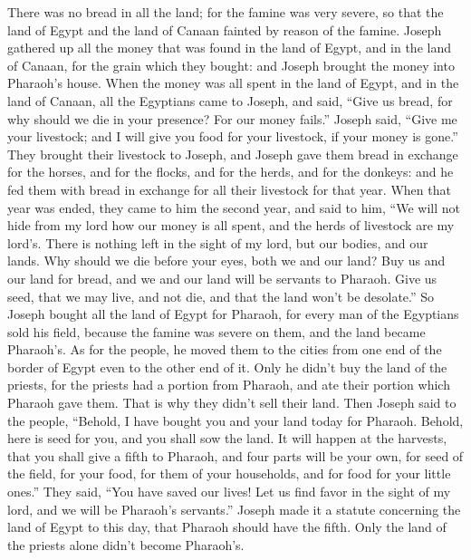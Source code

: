 \begin{paracol}{2}
\begin{otherlanguage}{english}
 There was no bread in all the land; for the famine was
very severe, so that the land of Egypt and the land of Canaan fainted by
reason of the famine.  Joseph gathered up all the money
that was found in the land of Egypt, and in the land of Canaan, for the
grain which they bought: and Joseph brought the money into Pharaoh's
house.  When the money was all spent in the land of
Egypt, and in the land of Canaan, all the Egyptians came to Joseph, and
said, ``Give us bread, for why should we die in your presence? For our
money fails.''  Joseph said, ``Give me your livestock;
and I will give you food for your livestock, if your money is gone.''
 They brought their livestock to Joseph, and Joseph gave
them bread in exchange for the horses, and for the flocks, and for the
herds, and for the donkeys: and he fed them with bread in exchange for
all their livestock for that year.  When that year was
ended, they came to him the second year, and said to him, ``We will not
hide from my lord how our money is all spent, and the herds of livestock
are my lord's. There is nothing left in the sight of my lord, but our
bodies, and our lands.  Why should we die before your
eyes, both we and our land? Buy us and our land for bread, and we and
our land will be servants to Pharaoh. Give us seed, that we may live,
and not die, and that the land won't be desolate.''  So
Joseph bought all the land of Egypt for Pharaoh, for every man of the
Egyptians sold his field, because the famine was severe on them, and the
land became Pharaoh's.  As for the people, he moved them
to the cities from one end of the border of Egypt even to the other end
of it.  Only he didn't buy the land of the priests, for
the priests had a portion from Pharaoh, and ate their portion which
Pharaoh gave them. That is why they didn't sell their land.
 Then Joseph said to the people, ``Behold, I have bought
you and your land today for Pharaoh. Behold, here is seed for you, and
you shall sow the land.  It will happen at the harvests,
that you shall give a fifth to Pharaoh, and four parts will be your own,
for seed of the field, for your food, for them of your households, and
for food for your little ones.''  They said, ``You have
saved our lives! Let us find favor in the sight of my lord, and we will
be Pharaoh's servants.''  Joseph made it a statute
concerning the land of Egypt to this day, that Pharaoh should have the
fifth. Only the land of the priests alone didn't become Pharaoh's.


\end{otherlanguage}
\end{paracol}
